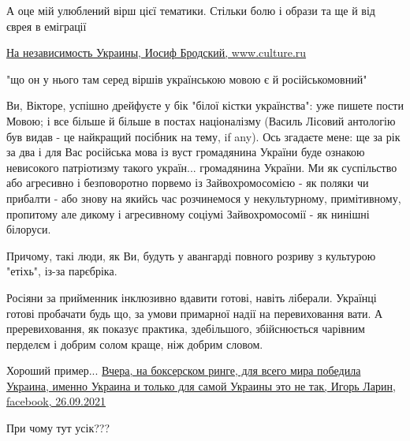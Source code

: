 \begin{itemize}

А оце мій улюблений вірш цієї тематики. Стільки болю і образи та ще й від єврея
в еміграції

\href{https://www.culture.ru/poems/30468/na-nezavisimost-ukrainy}{%
На независимость Украины, Иосиф Бродский, www.culture.ru%
}


"що он у нього там серед віршів українською мовою є й російськомовний"

Ви, Вікторе, успішно дрейфуєте у бік "білої кістки українства": уже пишете
пости Мовою; і все більше й більше в постах націоналізму (Василь Лісовий
антологію був видав - це найкращий посібник на тему, if any). Ось згадаєте
мене: ще за рік за два і для Вас російська мова із вуст громадянина України
буде ознакою невисокого патріотизму такого україн... громадянина України. Ми як
суспільство або агресивно і безповоротно порвемо із Зайвохромосомією - як
поляки чи прибалти - або знову на якийсь час розчинемося у некультурному,
примітивному, пропитому але дикому і агресивному соціумі Зайвохромосомії - як
нинішні білоруси.

Причому, такі люди, як Ви, будуть у авангарді повного розриву з культурою
"етіхь", із-за парєбріка.



Росіяни за прийменник інклюзивно вдавити готові, навіть ліберали. Українці
готові пробачати будь що, за умови примарної надії на перевиховання вати. А
преревиховання, як показує практика, здебільшого, збійснюється чарівним
перделєм і добрим солом краще, ніж добрим словом.

Хороший пример... \href{https://www.facebook.com/100000892405451/posts/4618914334814934/}{%
Вчера, на боксерском ринге, для всего мира победила Украина, именно Украина и только для самой Украины это не так, %
Игорь Ларин, facebook, 26.09.2021%
}

При чому тут усік???

\end{itemize} %
